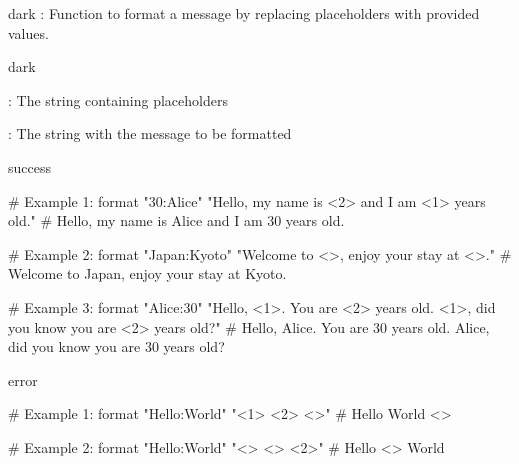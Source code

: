 \label{format}
\begin{baseBoxThree}{}{dark}
    \bigskip
    : Function to format a message by replacing placeholders with provided values.
    \bigskip
    \begin{baseBoxThree}{\fO}{dark}
        \smallskip
        \begin{posnexItemize}
            \item[\sA] : The string containing placeholders
            \item[\sA] : The string with the message to be formatted
        \end{posnexItemize}
        \smallskip
    \end{baseBoxThree}
    \smallskip
    \begin{baseBoxThree}{\fS}{success}
        \begin{posnex}
# Example 1:
format "30:Alice" "Hello, my name is <2> and I am <1> years old."
# Hello, my name is Alice and I am 30 years old.

# Example 2:
format "Japan:Kyoto" "Welcome to <>, enjoy your stay at <>."
# Welcome to Japan, enjoy your stay at Kyoto.

# Example 3:
format "Alice:30" "Hello, <1>. You are <2> years old. <1>, did you know you are <2> years old?"
# Hello, Alice. You are 30 years old. Alice, did you know you are 30 years old?
        \end{posnex}
    \end{baseBoxThree}
    \smallskip
    \begin{baseBoxThree}{\fX}{error}
        \begin{posnex}
# Example 1:
format "Hello:World" "<1> <2> <>"
# Hello World <>

# Example 2:
format "Hello:World" "<> <> <2>"
# Hello <> World
    \end{posnex}
    \end{baseBoxThree}
    \smallskip
\end{baseBoxThree}
\bigskip

